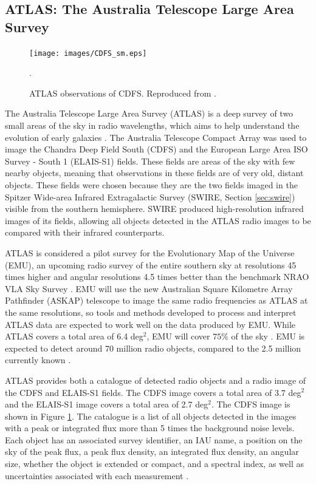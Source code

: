         \subsection{ATLAS: The Australia Telescope Large Area Survey}
        \label{sec:atlas}

            \begin{figure}[!ht]
              \texttt{[image: images/CDFS\_sm.eps]}
              \caption{ATLAS observations of CDFS. Reproduced from \citet{franzen15}.}.
              \label{fig:cdfs}
            \end{figure}

            The Australia Telescope Large Area Survey (ATLAS) is a deep  survey of two small areas of the sky in radio wavelengths, which aims to help understand the evolution of early galaxies \citep{norris06}. The Australia Telescope Compact Array was used to image the Chandra Deep Field South (CDFS) and the European Large Area ISO Survey - South 1 (ELAIS-S1) fields. These fields are areas of the sky with few nearby objects, meaning that observations in these fields are of very old, distant objects. These fields were chosen because they are the two fields imaged in the Spitzer Wide-area Infrared Extragalactic Survey (SWIRE, Section \ref{sec:swire}) visible from the southern hemisphere. SWIRE produced high-resolution infrared images of its fields, allowing all objects detected in the ATLAS radio images to be compared with their infrared counterparts.

            ATLAS is considered a pilot survey for the Evolutionary Map of the Universe (EMU), an upcoming radio survey of the entire southern sky at resolutions 45 times higher and angular resolutions 4.5 times better than the benchmark NRAO VLA Sky Survey \citep{norris11b}. EMU will use the new Australian Square Kilometre Array Pathfinder (ASKAP) telescope to image the same radio frequencies as ATLAS at the same resolutions, so tools and methods developed to process and interpret ATLAS data are expected to work well on the data produced by EMU. While ATLAS covers a total area of 6.4 deg$^2$, EMU will cover $75\%$ of the sky \citep{norris11b, norris16}. EMU is expected to detect around 70 million radio objects, compared to the 2.5 million currently known \citep{banfield15}.

            ATLAS provides both a catalogue of detected radio objects and a radio image of the CDFS and ELAIS-S1 fields. The CDFS image covers a total area of 3.7 deg$^2$ and the ELAIS-S1 image covers a total area of 2.7 deg$^2$. The CDFS image is shown in Figure \ref{fig:cdfs}. The catalogue is a list of all objects detected in the images with a peak or integrated flux more than 5 times the background noise levels. Each object has an associated survey identifier, an IAU name, a position on the sky of the peak flux, a peak flux density, an integrated flux density, an angular size, whether the object is extended or compact, and a spectral index, as well as uncertainties associated with each measurement \citep{franzen15}.

